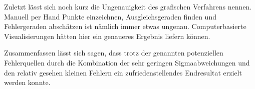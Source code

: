 \documentclass{article}
\begin{document}
Zuletzt lässt sich noch kurz die Ungenauigkeit des grafischen Verfahrens nennen. Manuell per Hand Punkte einzeichnen, Ausgleichsgeraden finden und Fehlergeraden abschätzen ist nämlich immer etwas ungenau. Computerbasierte Visualisierungen hätten hier ein genaueres Ergebnis liefern können.


Zusammenfassen lässt sich sagen, dass trotz der genannten potenziellen Fehlerquellen durch die Kombination der sehr geringen Sigmaabweichungen und den relativ gesehen kleinen Fehlern ein  zufriedenstellendes Endresultat erzielt werden konnte.
\end{document}
